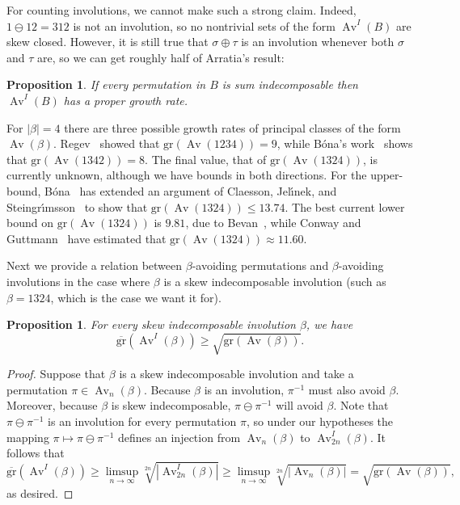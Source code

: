 \documentclass[10pt]{article}
\theoremstyle{plain}
\newtheorem{proposition}[theorem]{Proposition}
\newcommand{\Av}{\operatorname{Av}}
\newcommand{\gr}{\mathrm{gr}}
\newcommand{\ugr}{\overline{\mathrm{gr}}}
\begin{document}
For counting involutions, we cannot make such a strong claim. Indeed, $1\ominus 12=312$ is not an involution, so no nontrivial sets of the form $\Av^I(B)$ are skew closed. However, it is still true that $\sigma\oplus\tau$ is an involution whenever both $\sigma$ and $\tau$ are, so we can get roughly half of Arratia's result:

\begin{proposition}
\label{prop-gr-involution}
If every permutation in $B$ is sum indecomposable then $\Av^I(B)$ has a proper growth rate.
\end{proposition}

For $|\beta|=4$ there are three possible growth rates of principal classes of the form $\Av(\beta)$. Regev~\cite{regev:asymptotic-valu:} showed that $\gr(\Av(1234))=9$, while B\'ona's work~\cite{bona:exact-enumerati:} shows that $\gr(\Av(1342))=8$. The final value, that of $\gr(\Av(1324))$, is currently unknown, although we have bounds in both directions. For the upper-bound, B\'ona~\cite{bona:a-new-record-fo:,bona:a-new-upper-bou:} has extended an argument of Claesson, Jel{\'{\i}}nek, and Steingr{\'{\i}}msson~\cite{claesson:upper-bounds-fo:} to show that $\gr(\Av(1324))\le 13.74$. The best current lower bound on $\gr(\Av(1324))$ is $9.81$, due to Bevan~\cite{bevan:a-large-set-of-:}, while Conway and Guttmann~\cite{conway:on-the-growth-r:} have estimated that $\gr(\Av(1324))\approx 11.60$.

Next we provide a relation between $\beta$-avoiding permutations and $\beta$-avoiding involutions in the case where $\beta$ is a skew indecomposable involution (such as $\beta=1324$, which is the case we want it for).

\begin{proposition}
\label{prop-skew-indecomp-lower-bound}
For every skew indecomposable involution $\beta$, we have
$$
\ugr(\Av^I(\beta))\ge\sqrt{\gr(\Av(\beta))}.
$$
\end{proposition}
\begin{proof}
Suppose that $\beta$ is a skew indecomposable involution and take a permutation $\pi\in\Av_n(\beta)$. Because $\beta$ is an involution, $\pi^{-1}$ must also avoid $\beta$. Moreover, because $\beta$ is skew indecomposable, $\pi\ominus\pi^{-1}$ will avoid $\beta$. Note that $\pi\ominus\pi^{-1}$ is an involution for every permutation $\pi$, so under our hypotheses the mapping $\pi\mapsto\pi\ominus\pi^{-1}$ defines an injection from $\Av_n(\beta)$ to $\Av_{2n}^I(\beta)$. It follows that
$$
\ugr(\Av^I(\beta))
\ge
\limsup_{n\rightarrow\infty} \sqrt[2n]{|\Av_{2n}^I(\beta)|}
\ge
\limsup_{n\rightarrow\infty} \sqrt[2n]{|\Av_n(\beta)|}
=
\sqrt{\gr(\Av(\beta))},
$$
as desired.
\end{proof}
\end{document}
